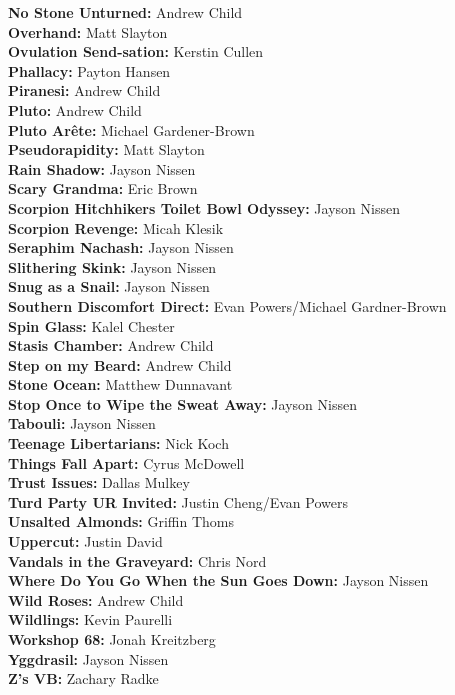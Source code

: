 \begin{flushleft}
\textbf{No Stone Unturned:} Andrew Child\\
\textbf{Overhand:} Matt Slayton\\
\textbf{Ovulation Send-sation:} Kerstin Cullen\\
\textbf{Phallacy:} Payton Hansen\\
\textbf{Piranesi:} Andrew Child\\
\textbf{Pluto:} Andrew Child\\
\textbf{Pluto Arête:} Michael Gardener-Brown\\
\textbf{Pseudorapidity:} Matt Slayton\\
\textbf{Rain Shadow:} Jayson Nissen\\
\textbf{Scary Grandma:} Eric Brown\\
\textbf{Scorpion Hitchhikers Toilet Bowl Odyssey:} Jayson Nissen\\
\textbf{Scorpion Revenge:} Micah Klesik\\
\textbf{Seraphim Nachash:} Jayson Nissen\\
\textbf{Slithering Skink:} Jayson Nissen\\
\textbf{Snug as a Snail:} Jayson Nissen\\
\textbf{Southern Discomfort Direct:} Evan Powers/Michael Gardner-Brown\\
\textbf{Spin Glass:} Kalel Chester\\
\textbf{Stasis Chamber:} Andrew Child\\
\textbf{Step on my Beard:} Andrew Child\\
\textbf{Stone Ocean:} Matthew Dunnavant\\
\textbf{Stop Once to Wipe the Sweat Away:} Jayson Nissen\\
\textbf{Tabouli:} Jayson Nissen\\
\textbf{Teenage Libertarians:} Nick Koch\\
\textbf{Things Fall Apart:} Cyrus McDowell\\
\textbf{Trust Issues:} Dallas Mulkey\\
\textbf{Turd Party UR Invited:} Justin Cheng/Evan Powers\\
\textbf{Unsalted Almonds:} Griffin Thoms\\
\textbf{Uppercut:} Justin David\\
\textbf{Vandals in the Graveyard:} Chris Nord\\
\textbf{Where Do You Go When the Sun Goes Down:} Jayson Nissen\\
\textbf{Wild Roses:} Andrew Child\\
\textbf{Wildlings:} Kevin Paurelli\\
\textbf{Workshop 68:} Jonah Kreitzberg\\
\textbf{Yggdrasil:} Jayson Nissen\\
\textbf{Z's VB:} Zachary Radke\\
\needspace{1.5cm}

\end{flushleft}
